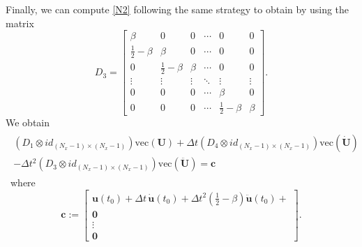 \documentclass[a4paper, 10pt]{article}
\begin{document}
Finally, we can compute \eqref{N2} following the same strategy to obtain by using the matrix
$$
D_3 = \left[
\begin{array}{cccccc}
\beta & 0 & 0 & \cdots & 0 & 0 \\
\frac{1}{2}-\beta  & \beta & 0 & \cdots & 0 & 0 \\
0 &\frac{1}{2}-\beta  & \beta & \cdots & 0 & 0 \\
\vdots & \vdots & \vdots & \ddots & \vdots & \vdots \\
0 & 0 & 0 & \cdots & \beta & 0 \\
0 & 0 & 0 & \cdots &\frac{1}{2}-\beta & \beta 
\end{array}  
\right].
$$
We obtain
\begin{align}
\begin{array}{c}
\left( D_1 \otimes  id_{(N_x-1)\times(N_x-1)}\right) \mathrm{vec}(\mathbf{U}) + \Delta t
\left(D_4 \otimes  id_{(N_x-1)\times(N_x-1)} \right)\mathrm{vec}(\dot{\mathbf{U}}) \\ - \Delta t^2 \left( D_3 \otimes  id_{(N_x-1)\times(N_x-1)} \right) \mathrm{vec}(\ddot{\mathbf{U}}) = \mathbf{c}
\end{array}\label{newmark3}
\end{align}\
where
$$
\mathbf{c}:= \left[
\begin{array}{c}
\mathbf{u}(t_0) + \Delta t \, \dot{\mathbf{u}}(t_0) + \Delta t^2 \left(\frac{1}{2}-\beta\right)\ddot{\mathbf{u}}(t_0)+  \\
\mathbf{0} \\
\vdots \\
\mathbf{0} 
\end{array}
\right].
$$

\bigskip

\end{document}
